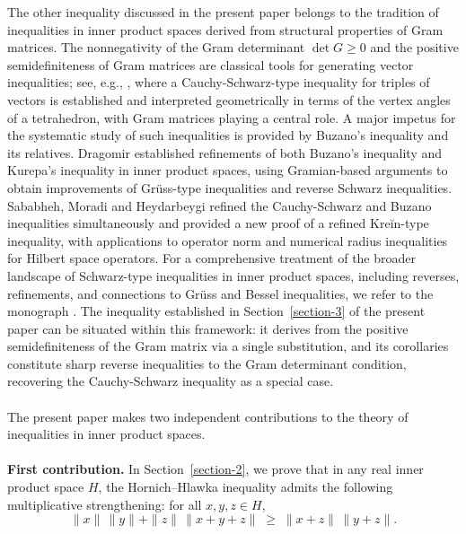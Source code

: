\documentclass[a4paper,10pt]{article}
\theoremstyle{plain}
\theoremstyle{definition}
\theoremstyle{remark}
\begin{document}
The other inequality discussed in the present paper belongs to the tradition of inequalities in inner product spaces derived from structural properties of Gram matrices. The nonnegativity of the Gram determinant $\det G \geq 0$ and the positive semidefiniteness of Gram matrices are classical tools for generating vector inequalities; see, e.g., \cite{AravHallLi2008}, where a Cauchy-Schwarz-type inequality for triples of vectors is established and interpreted geometrically in terms of the vertex angles of a tetrahedron, with Gram matrices playing a central role. A major impetus for the systematic study of such inequalities is provided by Buzano's inequality and its relatives. Dragomir \cite{Dragomir2005} established refinements of both Buzano's inequality and Kurepa's inequality in inner product spaces, using Gramian-based arguments to obtain improvements of Grüss-type inequalities and reverse Schwarz inequalities. Sababheh, Moradi and Heydarbeygi \cite{SababhehMoradiHeydarbeygi2022} refined the Cauchy-Schwarz and Buzano inequalities simultaneously and provided a new proof of a refined Kreĭn-type inequality, with applications to operator norm and numerical radius inequalities for Hilbert space operators. For a comprehensive treatment of the broader landscape of Schwarz-type inequalities in inner product spaces, including reverses, refinements, and connections to Grüss and Bessel inequalities, we refer to the monograph \cite{Dragomir2005book}. The inequality established in Section~\ref{section-3} of the present paper can be situated within this framework: it derives from the positive semidefiniteness of the Gram matrix via a single substitution, and its corollaries constitute sharp reverse inequalities to the Gram determinant condition, recovering the Cauchy-Schwarz inequality as a special case. \\ \\
The present paper makes two independent contributions to the theory of inequalities in inner product spaces. \\ \\
\textbf{First contribution.} In Section~\ref{section-2}, we prove that in any real inner product space $H$, the Hornich–Hlawka inequality admits the following multiplicative strengthening: for all $x,y,z \in H$,
\[\|x\|\,\|y\| + \|z\|\,\|x+y+z\| \;\geq\; \|x+z\|\,\|y+z\|.\]
\end{document}
